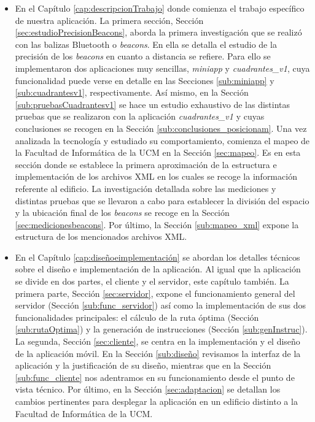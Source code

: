 \begin{itemize}
	\item En el Capítulo \ref{cap:descripcionTrabajo} donde comienza el trabajo específico de nuestra aplicación. La primera sección, Sección \ref{sec:estudioPrecisionBeacons}, aborda la primera investigación que se realizó con las balizas Bluetooth o \textit{beacons}. En ella se detalla el estudio de la precisión de los \textit{beacons} en cuanto a distancia se refiere. Para ello se implementaron dos aplicaciones muy sencillas, \textit{miniapp} y \textit{cuadrantes\_v1}, cuya funcionalidad puede verse en detalle en las Secciones \ref{sub:miniapp} y \ref{sub:cuadrantesv1}, respectivamente. Así mismo, en la Sección \ref{sub:pruebasCuadrantesv1} se hace un estudio exhaustivo de las distintas pruebas que se realizaron con la aplicación \textit{cuadrantes\_v1} y cuyas conclusiones se recogen en la Sección \ref{sub:conclusiones_posicionam}. Una vez analizada la tecnología y estudiado su comportamiento, comienza el mapeo de la Facultad de Informática de la UCM en la Sección \ref{sec:mapeo}. Es en esta sección donde se establece la primera aproximación de la estructura e implementación de los archivos XML en los cuales se recoge la información referente al edificio. La investigación detallada sobre las mediciones y distintas pruebas que se llevaron a cabo para establecer la división del espacio y la ubicación final de los \textit{beacons} se recoge en la Sección \ref{sec:medicionesbeacons}. Por último, la Sección \ref{sub:mapeo_xml} expone la estructura de los mencionados archivos XML.

	\item En el Capítulo \ref{cap:diseñoeimplementación} se abordan los detalles técnicos sobre el diseño e implementación de la aplicación. Al igual que la aplicación se divide en dos partes, el cliente y el servidor, este capítulo también. La primera parte, Sección \ref{sec:servidor}, expone el funcionamiento general del servidor (Sección \ref{sub:func_servidor}) así como la implementación de sus dos funcionalidades principales: el cálculo de la ruta óptima (Sección \ref{sub:rutaOptima}) y la generación de instrucciones (Sección \ref{sub:genInstruc}). La segunda, Sección \ref{sec:cliente}, se centra en la implementación y el diseño de la aplicación móvil. En la Sección \ref{sub:diseño} revisamos la interfaz de la aplicación y la justificación de su diseño, mientras que en la Sección \ref{sub:func_cliente} nos adentramos en su funcionamiento desde el punto de vista técnico. Por último, en la Sección \ref{sec:adaptacion} se detallan los cambios pertinentes para desplegar la aplicación en un edificio distinto a la Facultad de Informática de la UCM.


\end{itemize}
